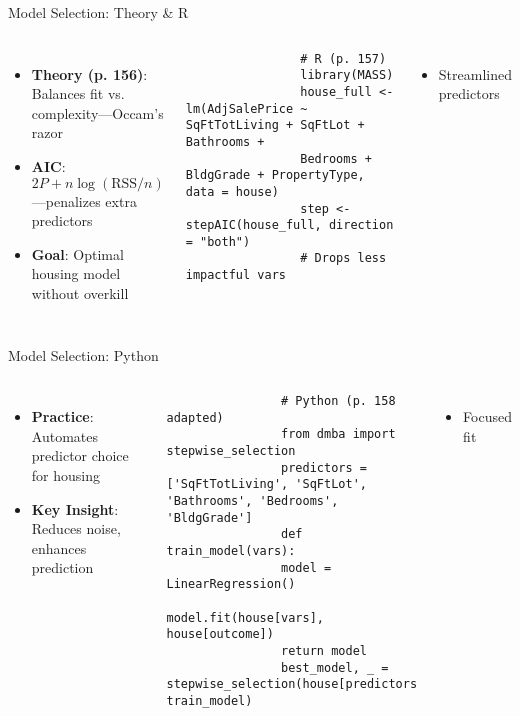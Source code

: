 \documentclass{beamer}
\begin{document}
	\begin{frame}[fragile]{Model Selection: Theory \& R}
		\begin{columns}
			\begin{itemize}
				\item \textbf{Theory (p. 156)}: Balances fit vs. complexity—Occam’s razor
				\item \textbf{AIC}: $2P + n\log(\text{RSS}/n)$—penalizes extra predictors
				\item \textbf{Goal}: Optimal housing model without overkill
			\end{itemize}
			\begin{lstlisting}
				# R (p. 157)
				library(MASS)
				house_full <- lm(AdjSalePrice ~ SqFtTotLiving + SqFtLot + Bathrooms +
				Bedrooms + BldgGrade + PropertyType, data = house)
				step <- stepAIC(house_full, direction = "both")
				# Drops less impactful vars
			\end{lstlisting}
			\begin{itemize}
				\item Streamlined predictors
			\end{itemize}
		\end{columns}
	\end{frame}
	
	\begin{frame}[fragile]{Model Selection: Python}
		\lstset{language=Python}
		\begin{columns}
			\column{0.6\textwidth}
			\begin{itemize}
				\item \textbf{Practice}: Automates predictor choice for housing
				\item \textbf{Key Insight}: Reduces noise, enhances prediction
			\end{itemize}
			\begin{lstlisting}
				# Python (p. 158 adapted)
				from dmba import stepwise_selection
				predictors = ['SqFtTotLiving', 'SqFtLot', 'Bathrooms', 'Bedrooms', 'BldgGrade']
				def train_model(vars):
				model = LinearRegression()
				model.fit(house[vars], house[outcome])
				return model
				best_model, _ = stepwise_selection(house[predictors].columns, train_model)
			\end{lstlisting}
			\column{0.4\textwidth}
			\begin{itemize}
				\item Focused fit
			\end{itemize}
		\end{columns}
	\end{frame}
	
\end{document}
